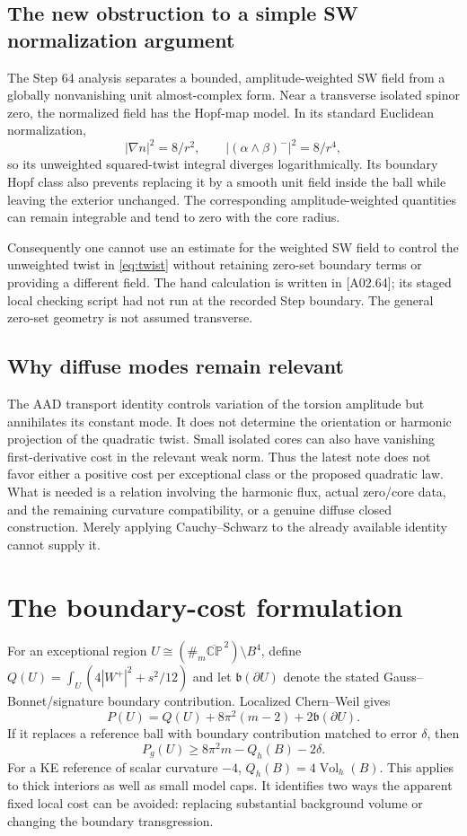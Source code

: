 \documentclass[11pt]{article}
\newcommand{\Vol}{\operatorname{Vol}}
\newcommand{\CP}{\mathbb{CP}}
\newcommand{\sref}[1]{\textsf{[#1]}}
\theoremstyle{remark}
\begin{document}
\subsection{The new obstruction to a simple SW normalization argument}
The Step 64 analysis separates a bounded, amplitude-weighted SW field from
a globally nonvanishing unit almost-complex form. Near a transverse isolated
spinor zero, the normalized field has the Hopf-map model. In its standard
Euclidean normalization,
\[
 |\nabla n|^2=8/r^2,\qquad |(\alpha\wedge\beta)^-|^2=8/r^4,
\]
so its unweighted squared-twist integral diverges logarithmically. Its
boundary Hopf class also prevents replacing it by a smooth unit field inside
the ball while leaving the exterior unchanged. The corresponding
amplitude-weighted quantities can remain integrable and tend to zero with
the core radius.

Consequently one cannot use an estimate for the weighted SW field to control
the unweighted twist in \eqref{eq:twist} without retaining zero-set boundary
terms or providing a different field. The hand calculation is written in
\sref{A02.64}; its staged local checking script had not run at the recorded
Step boundary. The general zero-set geometry is not assumed transverse.

\subsection{Why diffuse modes remain relevant}
The AAD transport identity controls variation of the torsion amplitude but
annihilates its constant mode. It does not determine the orientation or
harmonic projection of the quadratic twist. Small isolated cores can also
have vanishing first-derivative cost in the relevant weak norm.
Thus the latest note does not favor either a positive cost per exceptional
class or the proposed quadratic law. What is needed is a relation involving
the harmonic flux, actual zero/core data, and the remaining curvature
compatibility, or a genuine diffuse closed construction. Merely applying
Cauchy--Schwarz to the already available identity cannot supply it.

\section{The boundary-cost formulation}

For an exceptional region $U\cong(\#_m\overline{\CP}^{\,2})\setminus B^4$,
define $Q(U)=\int_U(4|W^+|^2+s^2/12)$ and let $\mathfrak b(\partial U)$
denote the stated Gauss--Bonnet/signature boundary contribution. Localized
Chern--Weil gives
\[
 P(U)=Q(U)+8\pi^2(m-2)+2\mathfrak b(\partial U).
\]
If it replaces a reference ball with boundary contribution matched to error
$\delta$, then
\[
 P_g(U)\ge8\pi^2m-Q_h(B)-2\delta.
\]
For a KE reference of scalar curvature $-4$, $Q_h(B)=4\Vol_h(B)$.
This applies to thick interiors as well as small model caps. It identifies
two ways the apparent fixed local cost can be avoided: replacing substantial
background volume or changing the boundary transgression.
\end{document}
